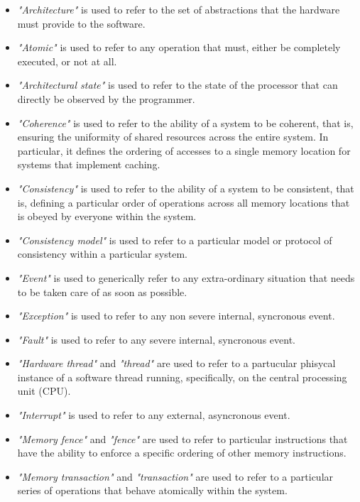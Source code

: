 \documentclass{article}
\begin{document}
        \begin{itemize}

            \item \textit{"Architecture"} is used to refer to the set of abstractions that the hardware must provide to the software.
            \item \textit{"Atomic"} is used to refer to any operation that must, either be completely executed, or not at all.
            \item \textit{"Architectural state"} is used to refer to the state of the processor that can directly be observed by the programmer.
            \item \textit{"Coherence"} is used to refer to the ability of a system to be coherent, that is, ensuring the uniformity of shared resources across the entire system. In particular, it defines the ordering of accesses to a single memory location for systems that implement caching.
            \item \textit{"Consistency"} is used to refer to the ability of a system to be consistent, that is, defining a particular order of operations across all memory locations that is obeyed by everyone within the system.
            \item \textit{"Consistency model"} is used to refer to a particular model or protocol of consistency within a particular system.
            \item \textit{"Event"} is used to generically refer to any extra-ordinary situation that needs to be taken care of as soon as possible.
            \item \textit{"Exception"} is used to refer to any non severe internal, syncronous event.
            \item \textit{"Fault"} is used to refer to any severe internal, syncronous event.
            \item \textit{"Hardware thread"} and \textit{"thread"} are used to refer to a partucular phisycal instance of a software thread running, specifically, on the central processing unit (CPU).
            \item \textit{"Interrupt"} is used to refer to any external, asyncronous event.
            \item \textit{"Memory fence"} and \textit{"fence"} are used to refer to particular instructions that have the ability to enforce a specific ordering of other memory instructions.
            \item \textit{"Memory transaction"} and \textit{"transaction"} are used to refer to a particular series of operations that behave atomically within the system.

\end{itemize}
\end{document}
